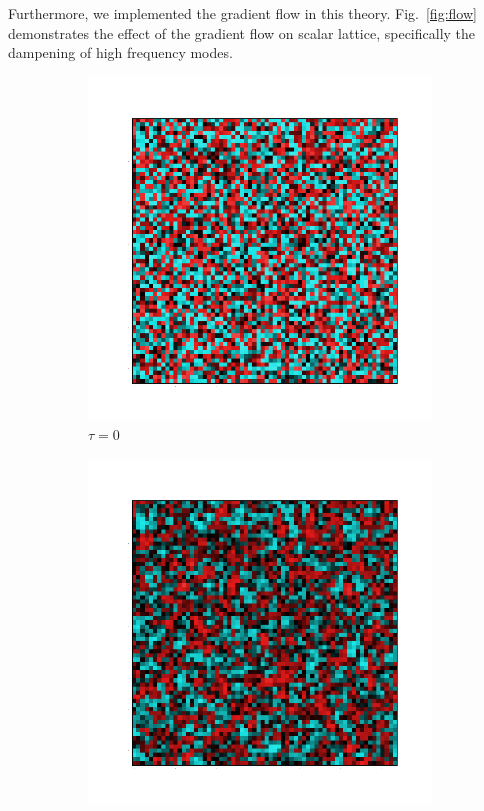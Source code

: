 \documentclass[12pt]{report}
\begin{document}
Furthermore, we implemented the gradient flow in this theory. Fig.~\ref{fig:flow} demonstrates the effect of the gradient flow on scalar lattice, specifically the dampening of high frequency modes.
\begin{figure}[h]
  \centering
      \begin{subfigure}[b]{0.2\textwidth}\centering
        \includegraphics[width=\textwidth]{imgs/0.png}
        \caption{$\tau=0$}
      \end{subfigure}
      \hfill
      \begin{subfigure}[b]{0.2\textwidth}\centering
        \includegraphics[width=\textwidth]{imgs/0_5.png}

\end{subfigure}
\end{figure}
\end{document}
